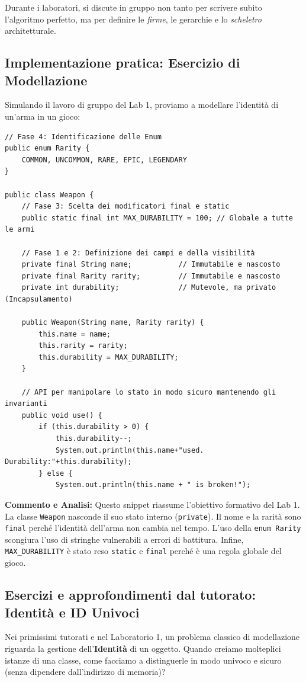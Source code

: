 \documentclass[12pt, a4paper]{article}
\begin{document}
Durante i laboratori, si discute in gruppo non tanto per scrivere subito l'algoritmo perfetto, ma per definire le \textit{firme}, le gerarchie e lo \textit{scheletro} architetturale.

\subsection{Implementazione pratica: Esercizio di Modellazione}
Simulando il lavoro di gruppo del Lab 1, proviamo a modellare l'identità di un'arma in un gioco:

\begin{verbatim}
// Fase 4: Identificazione delle Enum
public enum Rarity {
    COMMON, UNCOMMON, RARE, EPIC, LEGENDARY
}

public class Weapon {
    // Fase 3: Scelta dei modificatori final e static
    public static final int MAX_DURABILITY = 100; // Globale a tutte le armi

    // Fase 1 e 2: Definizione dei campi e della visibilità
    private final String name;           // Immutabile e nascosto
    private final Rarity rarity;         // Immutabile e nascosto
    private int durability;              // Mutevole, ma privato (Incapsulamento)
    
    public Weapon(String name, Rarity rarity) {
        this.name = name;
        this.rarity = rarity;
        this.durability = MAX_DURABILITY;
    }

    // API per manipolare lo stato in modo sicuro mantenendo gli invarianti
    public void use() {
        if (this.durability > 0) {
            this.durability--;
            System.out.println(this.name+"used. Durability:"+this.durability);
        } else {
            System.out.println(this.name + " is broken!");
\end{verbatim}
\textbf{Commento e Analisi:} Questo snippet riassume l'obiettivo formativo del Lab 1. La classe \texttt{Weapon} nasconde il suo stato interno (\texttt{private}). Il nome e la rarità sono \texttt{final} perché l'identità dell'arma non cambia nel tempo. L'uso della \texttt{enum Rarity} scongiura l'uso di stringhe vulnerabili a errori di battitura. Infine, \texttt{MAX\_DURABILITY} è stato reso \texttt{static} e \texttt{final} perché è una regola globale del gioco.

\subsection{Esercizi e approfondimenti dal tutorato: Identità e ID Univoci}
Nei primissimi tutorati e nel Laboratorio 1, un problema classico di modellazione riguarda la gestione dell'\textbf{Identità} di un oggetto. Quando creiamo molteplici istanze di una classe, come facciamo a distinguerle in modo univoco e sicuro (senza dipendere dall'indirizzo di memoria)? 
\end{document}
